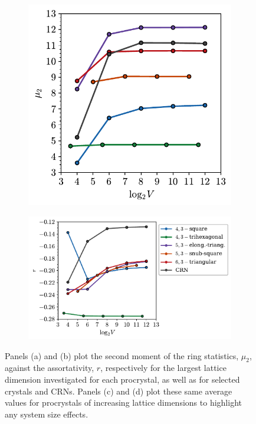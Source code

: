 \begin{figure}[bt]
     \begin{subfigure}[b]{0.37\textwidth}
         \centering
         \includegraphics[width=\textwidth]{./figures/procrystals/pro3_ss_mu2.pdf}
         \caption{}
         \label{fig:pro3p6ssmu2}
     \end{subfigure}
     \hfill
        \begin{subfigure}[b]{0.6\textwidth}
         \centering
         \includegraphics[width=\textwidth]{./figures/procrystals/pro3_ss_r.pdf}
         \caption{}
         \label{fig:pro3p6ssr}
     \end{subfigure}
     
     \caption{Panels (a) and (b) plot the second moment of the ring statistics, $\mu_2$, against the assortativity, $r$, respectively for the largest lattice dimension investigated for each procrystal, as well as for selected crystals and CRNs. Panels (c) and (d) plot these same average values for procrystals of increasing lattice dimensions to highlight any system size effects.}
     \label{fig:pro3p6mu2r}
\end{figure}


